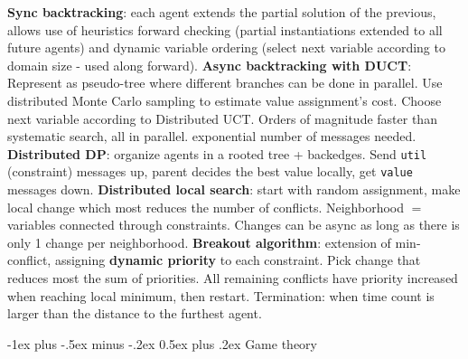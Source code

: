 \documentclass{article}
\makeatletter
\renewcommand{\section}{\@startsection{section}{1}{0mm}%
                                {-1ex plus -.5ex minus -.2ex}%
                                {0.5ex plus .2ex}%
                                {\color{blue}\normalfont\footnotesize\bfseries}}
\newcommand{\disadv}[1]{{\color{red} #1}}
\newcommand{\adv}[1]{{\color{green!60!blue} #1}}
\makeatother
\begin{document}
\begin{multicols*}{4}
\textbf{Sync backtracking}: each agent extends the partial solution of the previous, allows use of heuristics forward checking (partial instantiations extended to all future agents) and dynamic variable ordering (select next variable according to domain size - used along forward).
\textbf{Async backtracking with DUCT}: Represent as pseudo-tree where different branches can be done in parallel. Use distributed Monte Carlo sampling to estimate value assignment's cost. Choose next variable according to Distributed UCT. \adv{Orders of magnitude faster than systematic search, all in parallel}. \disadv{exponential number of messages needed}.
\textbf{Distributed DP}: organize agents in a rooted tree + backedges. Send \texttt{util} (constraint) messages up, parent decides the best value locally, get \texttt{value} messages down.
\textbf{Distributed local search}: start with random assignment, make local change which most reduces the number of conflicts. Neighborhood $=$ variables connected through constraints. Changes can be async as long as there is only 1 change per neighborhood.
\textbf{Breakout algorithm}: extension of min-conflict, assigning \textbf{dynamic priority} to each constraint. Pick change that reduces most the sum of priorities. All remaining conflicts have priority increased when reaching local minimum, then restart. Termination: when time count is larger than the distance to the furthest agent.

\section{Game theory}


\end{multicols*}
\end{document}
